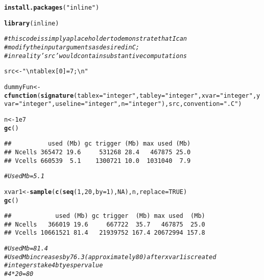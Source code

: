 \documentclass[english]{article}\usepackage[]{graphicx}\usepackage[]{color}
\makeatletter
\newcommand{\hlnum}[1]{\textcolor[rgb]{0.686,0.059,0.569}{#1}}%
\newcommand{\hlstr}[1]{\textcolor[rgb]{0.192,0.494,0.8}{#1}}%
\newcommand{\hlcom}[1]{\textcolor[rgb]{0.678,0.584,0.686}{\textit{#1}}}%
\newcommand{\hlstd}[1]{\textcolor[rgb]{0.345,0.345,0.345}{#1}}%
\newcommand{\hlkwb}[1]{\textcolor[rgb]{0.69,0.353,0.396}{#1}}%
\newcommand{\hlkwc}[1]{\textcolor[rgb]{0.333,0.667,0.333}{#1}}%
\newcommand{\hlkwd}[1]{\textcolor[rgb]{0.737,0.353,0.396}{\textbf{#1}}}%
\newenvironment{kframe}{%
 \def\at@end@of@kframe{}%
 \ifinner\ifhmode%
  \def\at@end@of@kframe{\end{minipage}}%
  \begin{minipage}{\columnwidth}%
 \fi\fi%
 \def\FrameCommand##1{\hskip\@totalleftmargin \hskip-\fboxsep
 \colorbox{shadecolor}{##1}\hskip-\fboxsep
     \hskip-\linewidth \hskip-\@totalleftmargin \hskip\columnwidth}%
 \MakeFramed {\advance\hsize-\width
   \@totalleftmargin\z@ \linewidth\hsize
   \@setminipage}}%
 {\par\unskip\endMakeFramed%
 \at@end@of@kframe}
\newenvironment{knitrout}{}{} %
\makeatother
\begin{document}
\begin{knitrout}
\color{fgcolor}\begin{kframe}
\begin{alltt}
\hlkwd{install.packages}\hlstd{(}\hlstr{"inline"}\hlstd{)}
\end{alltt}


{\ttfamily\noindent\itshape\color{messagecolor}{\#\# Installing package into '/Users/stephaniekim/Library/R/3.1/library'\\\#\# (as 'lib' is unspecified)}}

{\ttfamily\noindent\bfseries\color{errorcolor}{\#\# Error: trying to use CRAN without setting a mirror}}\begin{alltt}
\hlkwd{library}\hlstd{(inline)}

\hlcom{# this code is simply a placeholder to demonstrate that I can }
\hlcom{# modify the input arguments as desired in C; }
\hlcom{# in reality 'src' would contain substantive computations}

\hlstd{src} \hlkwb{<-} \hlstr{"\textbackslash{}n tablex[0] = 7;\textbackslash{}n"}

\hlstd{dummyFun} \hlkwb{<-} \hlkwd{cfunction}\hlstd{(}\hlkwd{signature}\hlstd{(}\hlkwc{tablex} \hlstd{=} \hlstr{"integer"}\hlstd{,} \hlkwc{tabley} \hlstd{=} \hlstr{"integer"}\hlstd{,} \hlkwc{xvar} \hlstd{=} \hlstr{"integer"}\hlstd{,} \hlkwc{yvar} \hlstd{=} \hlstr{"integer"}\hlstd{,} \hlkwc{useline} \hlstd{=} \hlstr{"integer"}\hlstd{,}\hlkwc{n} \hlstd{=} \hlstr{"integer"}\hlstd{), src,} \hlkwc{convention} \hlstd{=} \hlstr{".C"}\hlstd{)}

\hlstd{n}\hlkwb{<-}\hlnum{1e7}
\hlkwd{gc}\hlstd{()}
\end{alltt}
\begin{verbatim}
##          used (Mb) gc trigger (Mb) max used (Mb)
## Ncells 365472 19.6     531268 28.4   467875 25.0
## Vcells 660539  5.1    1300721 10.0  1031040  7.9
\end{verbatim}
\begin{alltt}
\hlcom{# Used Mb = 5.1}

\hlstd{xvar1}\hlkwb{<-}\hlkwd{sample}\hlstd{(}\hlkwd{c}\hlstd{(}\hlkwd{seq}\hlstd{(}\hlnum{1}\hlstd{,}\hlnum{20}\hlstd{,}\hlkwc{by}\hlstd{=}\hlnum{1}\hlstd{),}\hlnum{NA}\hlstd{),n,}\hlkwc{replace}\hlstd{=}\hlnum{TRUE}\hlstd{)}
\hlkwd{gc}\hlstd{()}
\end{alltt}
\begin{verbatim}
##            used (Mb) gc trigger  (Mb) max used  (Mb)
## Ncells   366019 19.6     667722  35.7   467875  25.0
## Vcells 10661521 81.4   21939752 167.4 20672994 157.8
\end{verbatim}
\begin{alltt}
\hlcom{# Used Mb = 81.4}
\hlcom{# Used Mb increases by 76.3 (approximately 80) after xvar1 is created }
\hlcom{# integers take 4 btyes per value }
\hlcom{# 4*20=80}


\end{alltt}
\end{kframe}
\end{knitrout}
\end{document}
